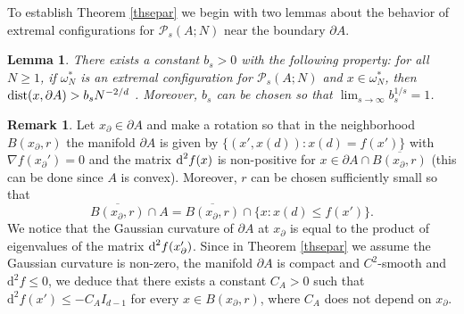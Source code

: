 \documentclass[12pt]{amsart}
\newtheorem{lemma}[theorem]{Lemma}
\theoremstyle{definition}
\newtheorem*{rem*}{Remark}
\newcommand{\1}{\mathbf{1}}
\newcommand{\PP}{\mathcal{P}}
\begin{document}
To establish Theorem \ref{thsepar} we begin with two lemmas about the behavior of extremal configurations for $\PP_s(A; N)$ near the boundary $\partial A$.
\begin{lemma}\label{notnearboundary}
There exists a constant $b_s>0$ with the following property: for all $N\geqslant 1$, if $\omega^*_N$ is an extremal configuration for $\PP_s(A; N)$ and $x\in \omega^*_N$, then $\textup{dist}(x, \partial A)>b_s N^{-2/d}$ . Moreover, $b_s$ can be chosen so that $\lim_{s\to \infty} b_s^{1/s} =1$.
\end{lemma}
\begin{rem*}
Let $x_\partial \in \partial A$ and make a rotation so that in the neighborhood $B(x_\partial, r)$ the manifold $\partial A$ is given by $\{(x', x(d))\colon x(d)=f(x')\}$ with $\nabla f(x_\partial')=0$ and the matrix $\textup{d}^2 f(x)$ is non-positive for $x\in \partial A\cap \overline{B(x_\partial, r)}$ (this can be done since $A$ is convex). Moreover, $r$ can be chosen sufficiently small so that
$$
\overline{B(x_\partial, r)} \cap A= \overline{B(x_\partial, r)}\cap \{x\colon x(d)\leqslant f(x')\}.
$$
We notice that the Gaussian curvature of $\partial A$ at $x_\partial$ is equal to the product of eigenvalues of the matrix $\textup{d}^2 f(x_\partial')$. Since in Theorem \ref{thsepar} we assume the Gaussian curvature is non-zero, the manifold $\partial A$ is compact and $C^2$-smooth and $\text{d}^2 f\leqslant 0$, we deduce that there exists a constant $C_A>0$ such that $\text{d}^2f(x')\leqslant -C_A I_{d-1}$ for every $x\in B(x_\partial, r)$, where $C_A$ does not depend on $x_\partial$.
\end{rem*}
\end{document}
